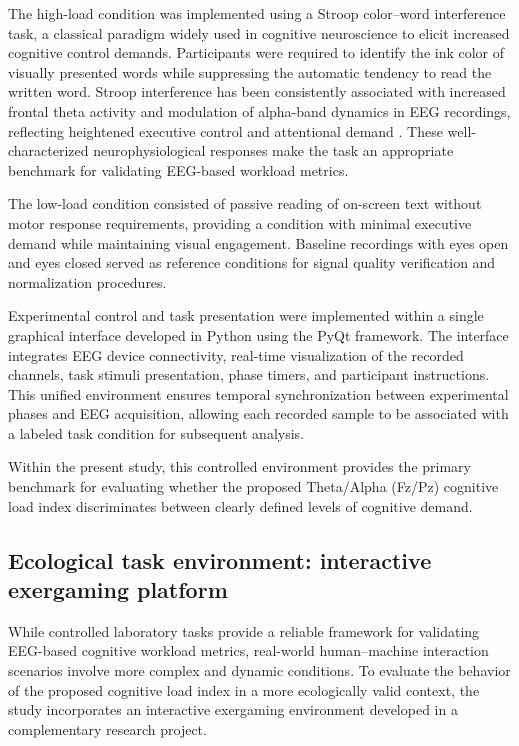 \documentclass[10pt]{iopart}
\begin{document}
The high-load condition was implemented using a Stroop color--word interference task, a classical paradigm widely used in cognitive neuroscience to elicit increased cognitive control demands. Participants were required to identify the ink color of visually presented words while suppressing the automatic tendency to read the written word. Stroop interference has been consistently associated with increased frontal theta activity and modulation of alpha-band dynamics in EEG recordings, reflecting heightened executive control and attentional demand \cite{c5,c9}. These well-characterized neurophysiological responses make the task an appropriate benchmark for validating EEG-based workload metrics.

The low-load condition consisted of passive reading of on-screen text without motor response requirements, providing a condition with minimal executive demand while maintaining visual engagement. Baseline recordings with eyes open and eyes closed served as reference conditions for signal quality verification and normalization procedures.

Experimental control and task presentation were implemented within a single graphical interface developed in Python using the PyQt framework. The interface integrates EEG device connectivity, real-time visualization of the recorded channels, task stimuli presentation, phase timers, and participant instructions. This unified environment ensures temporal synchronization between experimental phases and EEG acquisition, allowing each recorded sample to be associated with a labeled task condition for subsequent analysis.

Within the present study, this controlled environment provides the primary benchmark for evaluating whether the proposed Theta/Alpha (Fz/Pz) cognitive load index discriminates between clearly defined levels of cognitive demand.



\subsection{Ecological task environment: interactive exergaming platform}

While controlled laboratory tasks provide a reliable framework for validating EEG-based cognitive workload metrics, real-world human–machine interaction scenarios involve more complex and dynamic conditions. To evaluate the behavior of the proposed cognitive load index in a more ecologically valid context, the study incorporates an interactive exergaming environment developed in a complementary research project.
\end{document}
